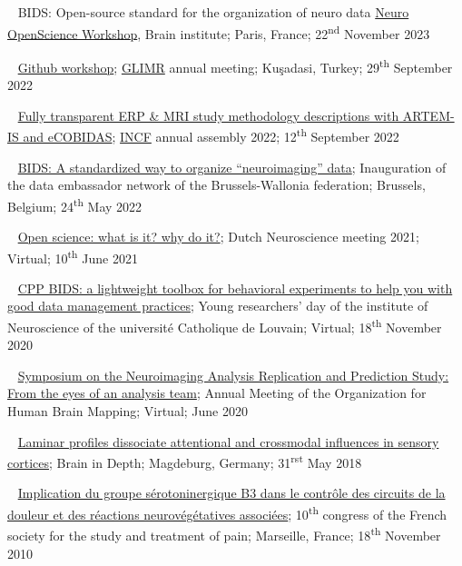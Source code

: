 \textbullet~ BIDS: Open-source standard for the organization of neuro data
\href{https://open-neuro.org/}{Neuro OpenScience Workshop}, Brain institute;
Paris, France;
22\textsuperscript{nd} November 2023

\textbullet~ \href{https://docs.google.com/presentation/d/1508GI_iLxyRwzJtWmnSQuSnfuGEUCaVXHguu8FRA4dI/}{Github workshop};
\href{https://glimr.eu/}{GLIMR} annual meeting;
Kuşadasi, Turkey;
29\textsuperscript{th} September 2022

\textbullet~ \href{https://docs.google.com/presentation/d/1z1aixJTiUl6plDOPEIobntSKUgspVaN6Doby5EDMubI/}{Fully transparent ERP \& MRI study methodology descriptions with ARTEM-IS and eCOBIDAS};
\href{https://www.incf.org}{INCF} annual assembly 2022;
12\textsuperscript{th} September 2022

\textbullet~ \href{https://osf.io/h7gcm}{BIDS: A standardized way to organize “neuroimaging” data};
Inauguration of the data embassador network of the Brussels-Wallonia federation;
Brussels, Belgium;
24\textsuperscript{th} May 2022

\textbullet~ \href{https://osf.io/ce7tn/}{Open science: what is it? why do it?};
Dutch Neuroscience meeting 2021;
Virtual;
10\textsuperscript{th} June 2021

\textbullet~ \href{https://osf.io/y7cjn/}{CPP BIDS: a lightweight toolbox for behavioral experiments to help you with good data management practices};
Young researchers' day of the institute of Neuroscience of the université Catholique de Louvain;
Virtual;
18\textsuperscript{th} November 2020

\textbullet~ \href{https://osf.io/b8p9e/}{Symposium on the Neuroimaging Analysis
Replication and Prediction Study: From the eyes of an analysis team};
Annual Meeting of the Organization for Human Brain Mapping;
Virtual;
June 2020

\textbullet~ \href{https://osf.io/b8p9e/}{Laminar profiles dissociate attentional and crossmodal influences in sensory cortices};
Brain in Depth;
Magdeburg, Germany;
31\textsuperscript{rst} May 2018

\textbullet~ \href{https://osf.io/r7gfm/}{Implication du groupe sérotoninergique B3 dans le contrôle des circuits de la douleur et des réactions neurovégétatives associées};
10\textsuperscript{th} congress of the French society for the study and treatment of pain;
Marseille, France;
18\textsuperscript{th} November 2010

